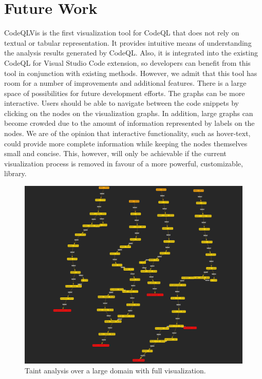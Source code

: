 \documentclass[sigplan,10pt,review]{acmart}
\begin{document}
\section{Future Work}
CodeQLVis is the first visualization tool for CodeQL that does not rely on textual or tabular representation. It provides intuitive means of understanding the analysis results generated by CodeQL. Also, it is integrated into the existing CodeQL for Visual Studio Code extension, so developers can benefit from this tool in conjunction with existing methods. However, we admit that this tool has room for a number of improvements and additional features. There is a large space of possibilities for future development efforts.
\newline
\indent The graphs can be more interactive. Users should be able to navigate between the code snippets by clicking on the nodes on the visualization graphs. In addition, large graphs can become crowded due to the amount of information represented by labels on the nodes. We are of the opinion that interactive functionality, such as hover-text, could provide more complete information while keeping the nodes themselves small and concise. This, however, will only be achievable if the current visualization process is removed in favour of a more powerful, customizable, library.

\begin{figure}[h]
  \centering
  \includegraphics[width=\linewidth]{large_taint_full}
  \caption{Taint analysis over a large domain with full visualization.}
\end{figure}
\end{document}
